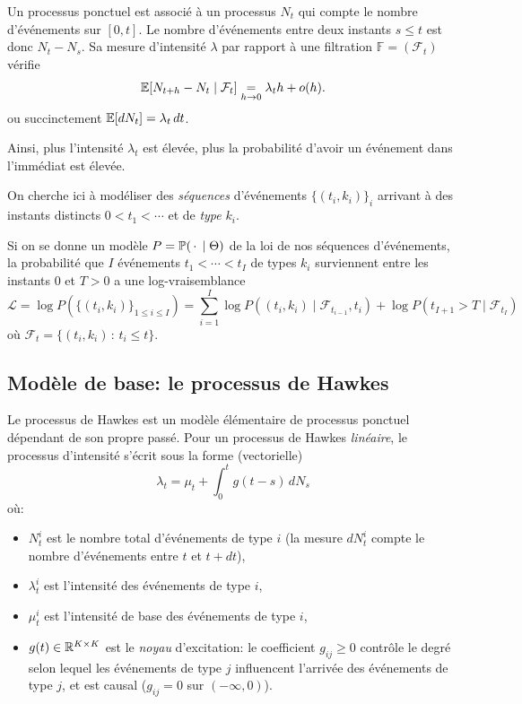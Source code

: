\documentclass[../main.tex]{subfiles}
\begin{document}
Un processus ponctuel est associé à un processus $N_t$ qui compte le nombre d'événements sur $[0,t]$. Le nombre d'événements entre deux instants $s\leq t$ est donc $N_t - N_s$. Sa mesure d'intensité $\lambda$ par rapport à une filtration $\mathds F = (\mathcal{F}_t)$ vérifie
\[
	\mathbb{E} [N_{t+h} - N_t \mid \mathcal{F}_t] \underset{h\to 0}{=} \lambda_th + o(h).
\]
ou succinctement $\mathbb{E}[dN_t] = \lambda_t\,dt$.

Ainsi, plus l'intensité $\lambda_t$ est élevée, plus la probabilité d'avoir un événement dans l'immédiat est élevée.

On cherche ici à modéliser des \textit{séquences} d'événements ${\{(t_i,k_i)\}}_i$ arrivant à des instants distincts $0<t_1 < \cdots$ et de \textit{type} $k_i$.

Si on se donne un modèle $P = \mathbb{P}(\,\cdot\,\mid \Theta)$ de la loi de nos séquences d'événements, la probabilité que $I$ événements $t_1<\cdots<t_I$ de types $k_i$ surviennent entre les instants $0$ et $T > 0$ a une log-vraisemblance
\begin{equation}\label{eq:likelihood}
	\mathcal{L} =
	\log P(\{(t_i,k_i)\}_{1\leq i\leq I}) =
	\sum_{i=1}^{I} \log P((t_i,k_i)\mid \mathcal{F}_{t_{i-1}}, t_i)
	+ \log P(t_{I+1}>T\mid \mathcal{F}_{t_{I}})
\end{equation}
où $\mathcal{F}_t = \{ (t_i,k_i)\,:\, t_i \leq t \}$.


\subsection{Modèle de base: le processus de Hawkes}

Le processus de Hawkes est un modèle élémentaire de processus ponctuel dépendant de son propre passé. Pour un processus de Hawkes \textit{linéaire}, le processus d'intensité s'écrit sous la forme (vectorielle)
\begin{equation}
\lambda_t = \mu_t + \int_0^t g(t-s)\,dN_s
\end{equation}
où:\begin{itemize}
	\item $N^i_t$ est le nombre total d'événements de type $i$ (la mesure $dN^i_t$ compte le nombre d'événements entre $t$ et $t+dt$),
	\item $\lambda_t^i$ est l'intensité des événements de type $i$,
	\item $\mu^i_t$ est l'intensité de base des événements de type $i$,
	\item $g(t) \in \mathbb{R}^{K\times K}$ est le \textit{noyau} d'excitation: le coefficient $g_{ij} \geq 0$ contrôle le degré selon lequel les événements de type $j$ influencent l'arrivée des événements de type $j$, et est causal ($g_{ij} = 0$ sur $(-\infty, 0)$).
\end{itemize}
\end{document}
